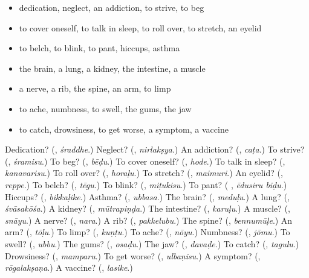 \begin{itemize}
\raggedright
  \item dedication, neglect, an addiction, to strive, to beg
  \item to cover oneself, to talk in sleep, to roll over, to stretch, an eyelid
  \item to belch, to blink, to pant, hiccups, asthma
  \item the brain, a lung, a kidney, the intestine, a muscle
  \item a nerve, a rib, the spine, an arm, to limp
  \item to ache, numbness, to swell, the gums, the jaw
  \item to catch, drowsiness, to get worse, a symptom, a vaccine
\end{itemize}

\begin{tcolorbox}[breakable,colback=teal!4,colframe=teal!35!black,title={Before you move on}]
Dedication? (\textbf{}, \emph{śraddhe}.) Neglect? (\textbf{}, \emph{nirlakṣya}.) An addiction? (\textbf{}, \emph{caṭa}.) To strive? (\textbf{}, \emph{śramisu}.) To beg? (\textbf{}, \emph{bēḍu}.) To cover oneself? (\textbf{}, \emph{hode}.) To talk in sleep? (\textbf{}, \emph{kanavarisu}.) To roll over? (\textbf{}, \emph{horaḷu}.) To stretch? (\textbf{}, \emph{maimuri}.) An eyelid? (\textbf{}, \emph{reppe}.) To belch? (\textbf{}, \emph{tēgu}.) To blink? (\textbf{}, \emph{miṭukisu}.) To pant? (\textbf{ }, \emph{ēdusiru biḍu}.) Hiccups? (\textbf{}, \emph{bikkaḷike}.) Asthma? (\textbf{}, \emph{ubbasa}.) The brain? (\textbf{}, \emph{meduḷu}.) A lung? (\textbf{}, \emph{śvāsakōśa}.) A kidney? (\textbf{}, \emph{mūtrapiṇḍa}.) The intestine? (\textbf{}, \emph{karuḷu}.) A muscle? (\textbf{}, \emph{snāyu}.) A nerve? (\textbf{}, \emph{nara}.) A rib? (\textbf{}, \emph{pakkelubu}.) The spine? (\textbf{}, \emph{bennumūḷe}.) An arm? (\textbf{}, \emph{tōḷu}.) To limp? (\textbf{}, \emph{kuṇṭu}.) To ache? (\textbf{}, \emph{nōyu}.) Numbness? (\textbf{}, \emph{jōmu}.) To swell? (\textbf{}, \emph{ubbu}.) The gums? (\textbf{}, \emph{osaḍu}.) The jaw? (\textbf{}, \emph{davaḍe}.) To catch? (\textbf{}, \emph{tagulu}.) Drowsiness? (\textbf{}, \emph{mamparu}.) To get worse? (\textbf{}, \emph{ulbaṇisu}.) A symptom? (\textbf{}, \emph{rōgalakṣaṇa}.) A vaccine? (\textbf{}, \emph{lasike}.)
\end{tcolorbox}
